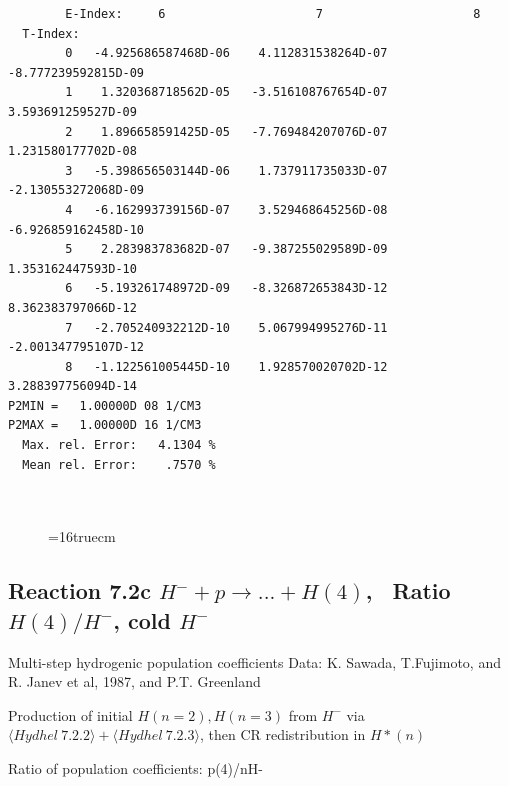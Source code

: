 \documentclass[12pt,dvipdfmx]{article}
\begin{document}
\begin{small}
\begin{verbatim}
        E-Index:     6                     7                     8
  T-Index:
        0   -4.925686587468D-06    4.112831538264D-07   -8.777239592815D-09
        1    1.320368718562D-05   -3.516108767654D-07    3.593691259527D-09
        2    1.896658591425D-05   -7.769484207076D-07    1.231580177702D-08
        3   -5.398656503144D-06    1.737911735033D-07   -2.130553272068D-09
        4   -6.162993739156D-07    3.529468645256D-08   -6.926859162458D-10
        5    2.283983783682D-07   -9.387255029589D-09    1.353162447593D-10
        6   -5.193261748972D-09   -8.326872653843D-12    8.362383797066D-12
        7   -2.705240932212D-10    5.067994995276D-11   -2.001347795107D-12
        8   -1.122561005445D-10    1.928570020702D-12    3.288397756094D-14
P2MIN =   1.00000D 08 1/CM3
P2MAX =   1.00000D 16 1/CM3
  Max. rel. Error:   4.1304 %
  Mean rel. Error:    .7570 %



\end{verbatim}\end{small}
\begin{figure} \label{7.2b}
\epsfxsize=16truecm
\end{figure}
\newpage

\subsection{
Reaction 7.2c $ H^- + p \rightarrow ...+ H(4) $, \   Ratio $H(4)/H^- $, cold $H^-$
}

 Multi-step hydrogenic population coefficients
 Data: K. Sawada, T.Fujimoto, \cite{kn:Sawada} and R. Janev et al, 1987, and P.T. Greenland

Production of initial $H(n=2), H(n=3)$ from $H^-$ via $ \langle Hydhel~ 7.2.2\rangle + \langle Hydhel~ 7.2.3\rangle$,
 then CR redistribution in $H*(n)$

 Ratio of population coefficients: p(4)/nH-
\end{document}
